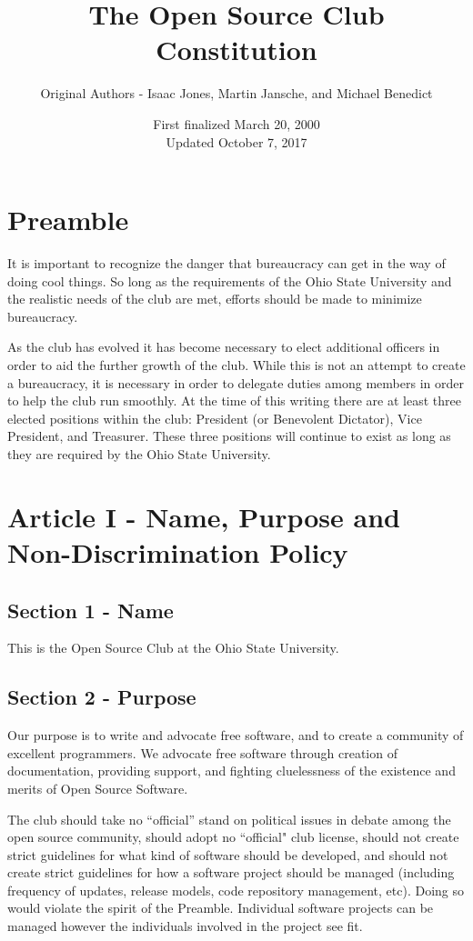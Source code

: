 \documentclass{article}
\title{The Open Source Club Constitution}
\author{Original Authors - Isaac Jones, Martin Jansche, and Michael Benedict}
\date{First finalized March 20, 2000\\ Updated October 7, 2017}
\begin{document}
	\maketitle

	\section{Preamble}

	It is important to recognize the danger that bureaucracy can get in the way of doing cool things.  So long as the requirements of the Ohio State University and the realistic needs of the club are met, efforts should be made to minimize bureaucracy.

	As the club has evolved it has become necessary to elect additional officers in order to aid the further growth of the club. While this is not an attempt to create a bureaucracy, it is necessary in order to delegate duties among members in order to help the club run smoothly. At the time of this writing there are at least three elected positions within the club: President (or Benevolent Dictator), Vice President, and Treasurer. These three positions will continue to exist as long as they are required by the Ohio State University.

	\section{Article I - Name, Purpose and Non-Discrimination Policy}

	\subsection{Section 1 - Name}

	This is the Open Source Club at the Ohio State University.

	\subsection{Section 2 - Purpose}

	Our purpose is to write and advocate free software, and to create a community of excellent programmers. We advocate free software through creation of documentation, providing support, and fighting cluelessness of the existence and merits of Open Source Software.

	The club should take no ``official'' stand on political issues in debate among the open source community, should adopt no ``official" club license, should not create strict guidelines for what kind of software should be developed, and should not create strict guidelines for how a software project should be managed (including frequency of updates, release models, code repository management, etc). Doing so would violate the spirit of the Preamble. Individual software projects can be managed however the individuals involved in the project see fit.
\end{document}
